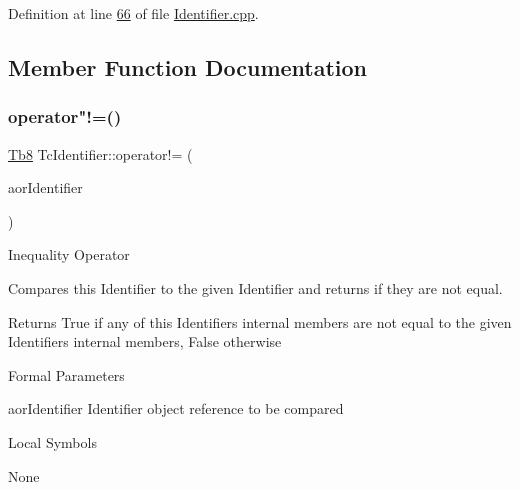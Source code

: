 Definition at line \mbox{\hyperlink{_identifier_8cpp_source_l00066}{66}} of file \mbox{\hyperlink{_identifier_8cpp_source}{Identifier.\+cpp}}.



\subsection{Member Function Documentation}
\mbox{\label{class_g_n_common_1_1_n_notification_1_1_tc_identifier_aaeba92963467ea1b7fb123094083633f}} 
\subsubsection{\texorpdfstring{operator"!=()}{operator!=()}}
{\footnotesize\ttfamily \mbox{\hyperlink{namespace_g_n_common_a8115dc7ed53b6e5b52e6bfde1632ea74}{Tb8}} Tc\+Identifier\+::operator!= (\begin{DoxyParamCaption}\item[{const \mbox{\hyperlink{class_g_n_common_1_1_n_notification_1_1_tc_identifier}{Tc\+Identifier}} \&}]{aor\+Identifier }\end{DoxyParamCaption})}

Inequality Operator

Compares this Identifier to the given Identifier and returns if they are not equal.

\begin{DoxyReturn}{Returns}
True if any of this Identifier\textquotesingle{}s internal members are not equal to the given Identifier\textquotesingle{}s internal members, False otherwise
\end{DoxyReturn}
\begin{DoxyParagraph}{Formal Parameters}

\begin{DoxyPre}{\ttfamily [ in ]  aorIdentifier    Identifier object reference to be compared }\end{DoxyPre}

\end{DoxyParagraph}
\begin{DoxyParagraph}{Local Symbols}

\begin{DoxyPre}{\ttfamily  None }\end{DoxyPre}
 
\end{DoxyParagraph}



